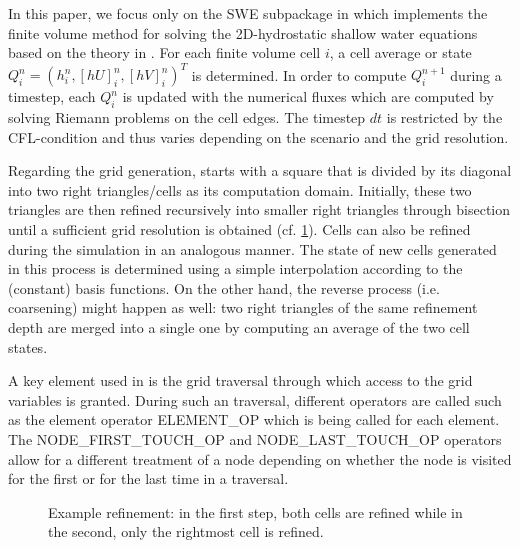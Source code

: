 In this paper, we focus only on the SWE subpackage in \samoa which implements the finite volume method for solving the 2D-hydrostatic shallow water equations based on the theory in \cite{leveque}. For each finite volume cell $i$, a cell average or state $Q_i^{n}= (h_i^{n},[hU]_i^{n},[hV]_i^{n})^T$ is determined. In order to compute $Q_i^{n+1}$ during a timestep, each $Q_i^{n}$ is updated with the numerical fluxes which are computed by solving Riemann problems on the cell edges. The timestep $dt$ is restricted by the CFL-condition and thus varies depending on the scenario and the grid resolution.  

Regarding the grid generation, \samoa starts with a square that is divided by its diagonal into two right triangles/cells as its computation domain. Initially, these two triangles are then refined recursively into smaller right triangles through bisection until a sufficient grid resolution is obtained (cf. \ref{fig:adapt_grid}). Cells can also be refined during the simulation in an analogous manner. The state of new cells generated in this process is determined using a simple interpolation according to the (constant) basis functions. On the other hand, the reverse process (i.e. coarsening) might happen as well: two right triangles of the same refinement depth are merged into a single one by computing an average of the two cell states.

A key element used in \samoa is the grid traversal through which access to the grid variables is granted. During such an traversal, different operators are called such as the element operator ELEMENT\_OP which is being called for each element. The NODE\_FIRST\_TOUCH\_OP and NODE\_LAST\_TOUCH\_OP operators allow for a different treatment of a node depending on whether the node is visited for the first or for the last time in a traversal.

\begin{figure}
\centering
{}
\caption{Example refinement: in the first step, both cells are refined while in the second, only the rightmost cell is refined.}
\label{fig:adapt_grid}
\end{figure}

